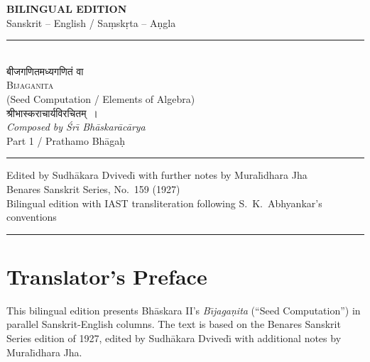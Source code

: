\documentclass[11pt,a4paper]{article}
\newcommand{\longline}{\noindent\rule{\textwidth}{0.4pt}}
\newcommand{\shortline}{\noindent\rule{0.5\textwidth}{0.4pt}\par}
\begin{document}
\thispagestyle{empty}
\begin{center}
\vspace*{1.5cm}
{\LARGE\bfseries BILINGUAL EDITION}\\[0.3cm]
{\large Sanskrit -- English / Sa\d{m}sk\d{r}ta -- A\d{n}gla}\\[0.5cm]
\longline\\[0.4cm]
{\Huge\devanagarifont बीजगणितमध्यगणितं वा}\\[0.3cm]
{\LARGE\scshape Bijaganita}\\[0.2cm]
{\normalsize (Seed Computation / Elements of Algebra)}\\[0.4cm]
{\large\devanagarifont श्रीभास्कराचार्यविरचितम्~।}\\[0.3cm]
{\large\itshape Composed by \'{S}r\={\i} Bh\={a}skar\={a}c\={a}rya}\\[0.6cm]
{\large Part 1 / Prathamo Bh\={a}ga\d{h}}\\[0.3cm]
\shortline
{\normalsize Edited by Sudh\={a}kara Dvived\={\i} with further notes by Mural\={\i}dhara Jha}\\[0.2cm]
{\small Benares Sanskrit Series, No.~159 (1927)}\\[0.3cm]
{\footnotesize Bilingual edition with IAST transliteration following S.~K.~Abhyankar's conventions}\\[0.5cm]
\longline
\end{center}
\clearpage

\thispagestyle{empty}
\section*{Translator's Preface}

This bilingual edition presents Bh\={a}skara II's \textit{B\={\i}jaga\d{n}ita} (``Seed Computation'') in parallel Sanskrit-English columns. The text is based on the Benares Sanskrit Series edition of 1927, edited by Sudh\={a}kara Dvived\={\i} with additional notes by Mural\={\i}dhara Jha.
\end{document}
